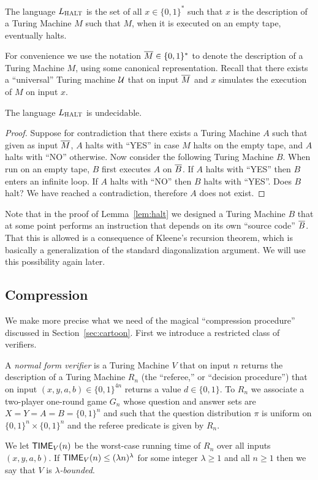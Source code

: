 \begin{definition}
The language $L_{\textsc{HALT}}$ is the set of all $x\in\{0,1\}^*$ such that 
 $x$ is the description of a Turing Machine $M$ such that $M$, when it is executed on an empty tape, eventually halts. 
\end{definition}

For convenience we use the notation $\overline{M}\in\{0,1\}^*$ to denote the description of a Turing Machine $M$, using some canonical representation. Recall that there exists a ``universal'' Turing machine $\mathcal{U}$ that on input $\overline{M}$ and $x$ simulates the execution of $M$ on input $x$. 

\begin{lemma}\label{lem:halt}
The language $L_{\textsc{HALT}}$ is undecidable. 
\end{lemma}

\begin{proof}
Suppose for contradiction that there exists a Turing Machine $A$ such that given as input $\overline{M}$, $A$ halts with ``YES'' in case $M$ halts on the empty tape, and $A$ halts with ``NO'' otherwise. Now consider the following Turing Machine $B$. When run on an empty tape, $B$ first executes $A$ on $\overline{B}$. If $A$ halts with ``YES'' then $B$ enters an infinite loop. If $A$ halts with ``NO'' then $B$ halts with ``YES''. Does $B$ halt? We have reached a contradiction, therefore $A$ does not exist. 
\end{proof}

Note that in the proof of Lemma~\ref{lem:halt} we designed a Turing Machine $B$ that at some point performs an instruction that depends on its own ``source code'' $\overline{B}$. That this is allowed is a consequence of Kleene's recursion theorem, which is basically a generalization of the standard diagonalization argument. We will use this possibility again later. 


\subsection{Compression}

We make more precise what we need of the magical ``compression procedure'' discussed in Section~\ref{sec:cartoon}. First we introduce a restricted class of verifiers. 

\begin{definition}
A \emph{normal form verifier} is a Turing Machine $V$ that on input $n$ returns the description of a Turing Machine $R_n$ (the ``referee,'' or ``decision procedure'') that on input $(x,y,a,b)\in \{0,1\}^{4n}$ returns a value $d\in \{0,1\}$. To $R_n$ we associate a two-player one-round game $G_n$ whose question and answer sets are $X=Y=A=B= \{0,1\}^n$ and such that the question distribution $\pi$ is uniform on $\{0,1\}^n \times \{0,1\}^n$ and the referee predicate is given by $R_n$. 

 We let $\mathsf{TIME}_V(n)$ be the worst-case running time of $R_n$ over all inputs $(x,y,a,b)$. If $\mathsf{TIME}_V(n) \leq (\lambda n)^\lambda$ for some integer $\lambda \geq 1$ and all $n\geq 1$ then we say that $V$ is \emph{$\lambda$-bounded}. 
\end{definition}

